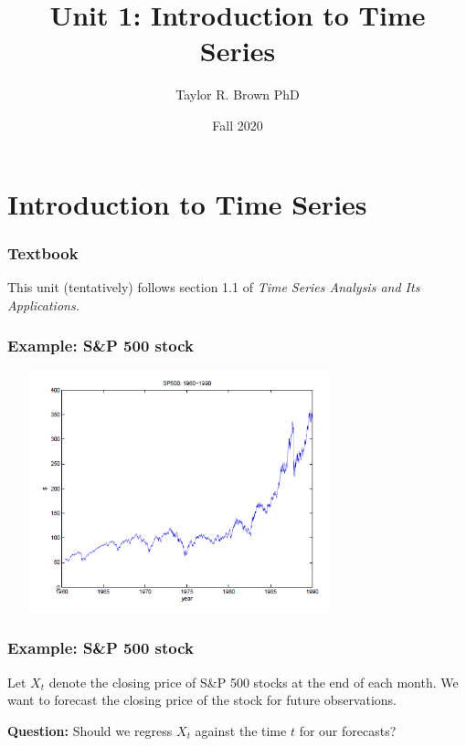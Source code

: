 \documentclass[%
xcolor=pdftex]{beamer}
\title{Unit 1: Introduction to Time Series}
\author[STAT 5170: Applied Time Series, Unit 1]{Taylor R. Brown PhD}
\institute{Department of Statistics, University of Virginia}
\date{Fall 2020}
\begin{document}
\frame{\titlepage}



\section{Introduction to Time Series}
\frame{\tableofcontents[currentsection]}


\begin{frame}
\frametitle{Textbook}

This unit (tentatively) follows section 1.1 of \it{ Time Series Analysis and Its Applications}.

\end{frame}


\begin{frame}
\frametitle{Example: S\&P 500 stock}

\includegraphics[width=100mm, height=70mm]{pics/sp500.png}

\end{frame}

\begin{frame}
\frametitle{Example: S\&P 500 stock}

Let $X_t$ denote the closing price of S\&P 500 stocks at the end of each month. We want to forecast the closing price of the stock for future observations. \\

\vspace{5mm}

\textbf{Question:} Should we regress $X_t$ against the time $t$ for our forecasts?

\end{frame}
\end{document}

